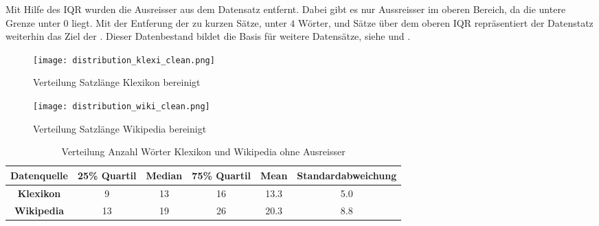 \noindent
Mit Hilfe des \gls{IQR} wurden die Ausreisser aus dem Datensatz entfernt. Dabei gibt es nur Aussreisser im oberen
Bereich, da die untere Grenze unter $ 0 $ liegt. Mit der Entferung der zu kurzen Sätze, unter $ 4 $ Wörter, und Sätze
über dem oberen \gls{IQR} repräsentiert der Datenstatz weiterhin das Ziel der . Dieser
Datenbestand bildet die Basis für weitere Datensätze, siehe  und
.
\begin{figure}[H]
    \texttt{[image: distribution\_klexi\_clean.png]}
    \caption{Verteilung Satzlänge Klexikon bereinigt}\label{fig:distribution_klexi_clean}
  \endminipage\hfill
    \texttt{[image: distribution\_wiki\_clean.png]}
    \caption{Verteilung Satzlänge Wikipedia bereinigt}\label{fig:distribution_wiki_clean}
  \endminipage\hfill      
\end{figure}
\begin{table}[H]
  \centering
  \begin{tabular}{|c|c|c|c|c|c|}
    \hline
    \textbf{Datenquelle}& \textbf{25\% Quartil}& \textbf{Median}& \textbf{75\% Quartil} & \textbf{Mean} &
    \textbf{Standardabweichung}\\
    \hline
    \textbf{Klexikon}& 9 & 13 & 16 & 13.3 & 5.0\\
    \hline
    \textbf{Wikipedia}& 13 & 19 & 26 & 20.3 & 8.8\\
    \hline
  \end{tabular}
  \caption{Verteilung Anzahl Wörter Klexikon und Wikipedia ohne Ausreisser} 
\label{tab:distribution_klexi_wiki_unclean}
\end{table} 


